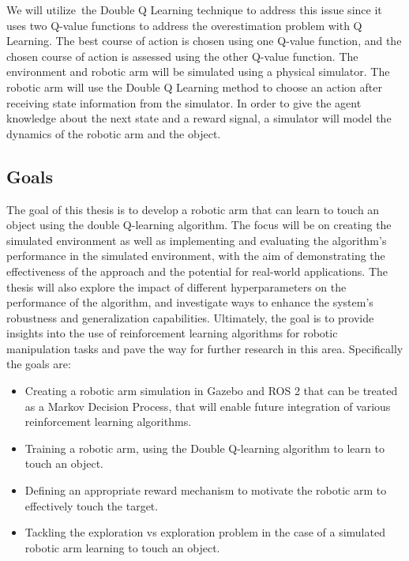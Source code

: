 \documentclass[12pt,oneside]{article}
\begin{document}
We will utilize the Double Q Learning technique to address this issue since it uses two Q-value functions to address the overestimation problem with Q Learning. The best course of action is chosen using one Q-value function, and the chosen course of action is assessed using the other Q-value function. The environment and robotic arm will be simulated using a physical simulator. The robotic arm will use the Double Q Learning method to choose an action after receiving state information from the simulator. In order to give the agent knowledge about the next state and a reward signal, a simulator will model the dynamics of the robotic arm and the object.

%
\subsection{Goals}\label{sec:goals}
The goal of this thesis is to develop a robotic arm that can learn to touch an object using the double Q-learning algorithm. The focus will be on creating the simulated environment as well as implementing and evaluating the algorithm's performance in the simulated environment, with the aim of demonstrating the effectiveness of the approach and the potential for real-world applications. The thesis will also explore the impact of different hyperparameters on the performance of the algorithm, and investigate ways to enhance the system's robustness and generalization capabilities. Ultimately, the goal is to provide insights into the use of reinforcement learning algorithms for robotic manipulation tasks and pave the way for further research in this area. Specifically the goals are:

\begin{itemize}
\item Creating a robotic arm simulation in Gazebo and ROS 2 that can be treated as a Markov Decision Process, that will enable future integration of various reinforcement learning algorithms.
\item Training a robotic arm, using the Double Q-learning algorithm to learn to touch an object.
\item Defining an appropriate reward mechanism to motivate the robotic arm to effectively touch the target.
\item Tackling the exploration vs exploration problem in the case of a simulated robotic arm learning to touch an object.

\end{itemize}
\end{document}
